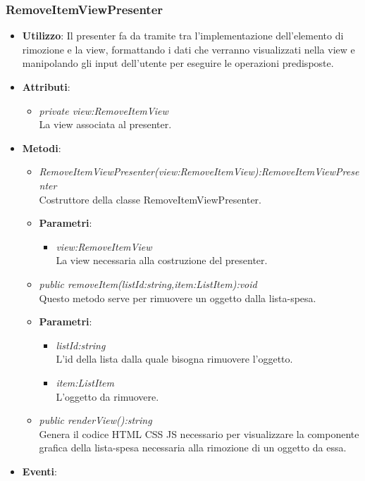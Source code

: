 \subsubsection{RemoveItemViewPresenter}
\begin{itemize}
item \textbf{Descrizione}: Questa classe rappresenta il presenter per gli elementi di rimozione degli oggetti  della lista-spesa.
\item \textbf{Utilizzo}: Il presenter fa da tramite tra l'implementazione dell'elemento di rimozione e la view, formattando i dati che verranno visualizzati nella view e manipolando gli input dell'utente per eseguire le operazioni predisposte.
\item \textbf{Attributi}: 
	\begin{itemize}
	\item \textit{private view:RemoveItemView}\\
	La view associata al presenter.
	\end{itemize}
\item \textbf{Metodi}:
	\begin{itemize}
	\item \textit{RemoveItemViewPresenter(view:RemoveItemView):RemoveItemViewPresenter}\\
	Costruttore della classe RemoveItemViewPresenter.
			\item{\textbf{Parametri}: \begin{itemize}
			\item \textit{view:RemoveItemView}\\
			La view necessaria alla costruzione del presenter.
			\end{itemize}}
	\item \textit{public removeItem(listId:string,item:ListItem):void}\\
	Questo metodo serve per rimuovere un oggetto dalla lista-spesa.
			\item{\textbf{Parametri}: \begin{itemize}
			\item \textit{listId:string}\\
			L'id della lista dalla quale bisogna rimuovere l'oggetto.
			\item \textit{item:ListItem}\\
			L'oggetto da rimuovere.
			\end{itemize}}
	\item \textit{public renderView():string}\\
	Genera il codice HTML CSS JS necessario per visualizzare la componente grafica della lista-spesa necessaria alla rimozione di un oggetto da essa.
	\end{itemize}
\item \textbf{Eventi}:
\end{itemize}

